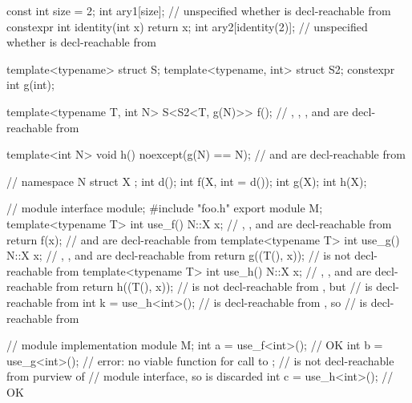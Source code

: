 \begin{std.txt}
\pnum
\begin{example}
\begin{codeblock}
const int size = 2;
int ary1[size];                 // unspecified whether  is decl-reachable from 
constexpr int identity(int x) { return x; }
int ary2[identity(2)];          // unspecified whether  is decl-reachable from 

template<typename> struct S;
template<typename, int> struct S2;
constexpr int g(int);

template<typename T, int N>
S<S2<T, g(N)>> f();             // , , , and \tcode{::} are decl-reachable from 

template<int N>
void h() noexcept(g(N) == N);   //  and \tcode{::} are decl-reachable from 
\end{codeblock}
\end{example}

\pnum
\begin{example}
\begin{codeblock}
// 
namespace N {
  struct X {};
  int d();
  int f(X, int = d());
  int g(X);
  int h(X);
}

// module  interface
module;
#include "foo.h"
export module M;
template<typename T> int use_f() {
  N::X x;                    // , , and \tcode{::} are decl-reachable from 
  return f(x);               //  and  are decl-reachable from 
}
template<typename T> int use_g() {
  N::X x;                    // , , and \tcode{::} are decl-reachable from 
  return g((T(), x));        //  is not decl-reachable from 
}
template<typename T> int use_h() {
  N::X x;                    // , , and \tcode{::} are decl-reachable from 
  return h((T(), x));        //  is not decl-reachable from , but
                             //  is decl-reachable from 
}
int k = use_h<int>();
  //  is decl-reachable from , so
  //  is decl-reachable from 

// module  implementation
module M;
int a = use_f<int>(); // OK
int b = use_g<int>(); // error: no viable function for call to ;
                      //  is not decl-reachable from purview of
                      // module  interface, so is discarded
int c = use_h<int>(); // OK
\end{codeblock}
\end{example}
\end{std.txt}


